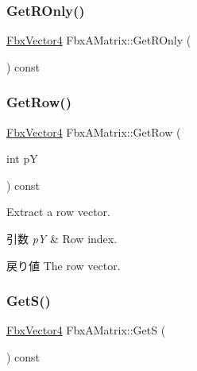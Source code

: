 \mbox{\label{class_fbx_a_matrix_a908a407eab72b8d71cf6c6ab9fa32e4f}} 
\subsubsection{\texorpdfstring{Get\+R\+Only()}{GetROnly()}}
{\footnotesize\ttfamily \hyperlink{class_fbx_vector4}{Fbx\+Vector4} Fbx\+A\+Matrix\+::\+Get\+R\+Only (\begin{DoxyParamCaption}{ }\end{DoxyParamCaption}) const}

\mbox{\label{class_fbx_a_matrix_ac9390e435954f95cee145123452ace46}} 
\subsubsection{\texorpdfstring{Get\+Row()}{GetRow()}}
{\footnotesize\ttfamily \hyperlink{class_fbx_vector4}{Fbx\+Vector4} Fbx\+A\+Matrix\+::\+Get\+Row (\begin{DoxyParamCaption}\item[{int}]{pY }\end{DoxyParamCaption}) const}

Extract a row vector. 
\begin{DoxyParams}{引数}
{\em pY} & Row index. \\
\hline
\end{DoxyParams}
\begin{DoxyReturn}{戻り値}
The row vector. 
\end{DoxyReturn}
\mbox{\label{class_fbx_a_matrix_a2d5efe3883f4a41c8ff8c223b5835fa1}} 
\subsubsection{\texorpdfstring{Get\+S()}{GetS()}}
{\footnotesize\ttfamily \hyperlink{class_fbx_vector4}{Fbx\+Vector4} Fbx\+A\+Matrix\+::\+GetS (\begin{DoxyParamCaption}{ }\end{DoxyParamCaption}) const}

